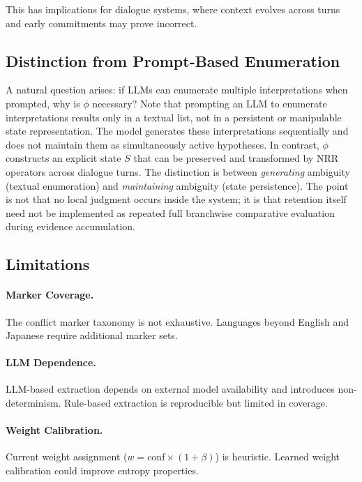 \documentclass[11pt,a4paper]{article}
\begin{document}
This has implications for dialogue systems, where context evolves across turns 
and early commitments may prove incorrect.

\subsection{Distinction from Prompt-Based Enumeration}

A natural question arises: if LLMs can enumerate multiple interpretations when 
prompted, why is $\phi$ necessary? Note that prompting an LLM to enumerate 
interpretations results only in a textual list, not in a persistent or manipulable 
state representation. The model generates these interpretations sequentially and 
does not maintain them as simultaneously active hypotheses. In contrast, $\phi$ 
constructs an explicit state $S$ that can be preserved and transformed by NRR 
operators across dialogue turns. The distinction is between \textit{generating} 
ambiguity (textual enumeration) and \textit{maintaining} ambiguity (state persistence). The point is not that no local judgment occurs inside the system; it is that retention itself need not be implemented as repeated full branchwise comparative evaluation during evidence accumulation.

\subsection{Limitations}

\paragraph{Marker Coverage.}
The conflict marker taxonomy is not exhaustive. Languages beyond English and 
Japanese require additional marker sets.

\paragraph{LLM Dependence.}
LLM-based extraction depends on external model availability and introduces 
non-determinism. Rule-based extraction is reproducible but limited in coverage.

\paragraph{Weight Calibration.}
Current weight assignment ($w = \text{conf} \times (1 + \beta)$) is heuristic. 
Learned weight calibration could improve entropy properties.
\end{document}

